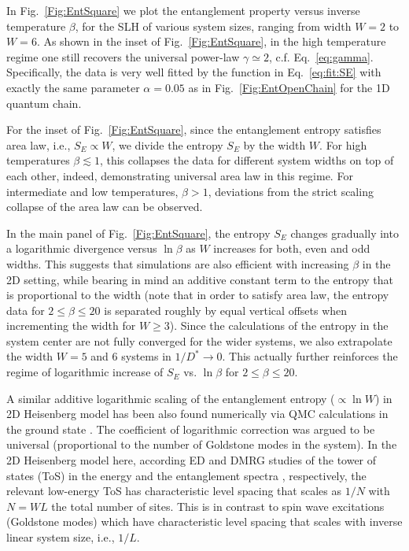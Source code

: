 \documentclass[aps,prx,twocolumn,showpacs,psfig,superscriptaddress,longbibliography]{revtex4-1}
\newcommand{\Eq}[1]{Eq.~\eqref{#1}}
\newcommand{\Fig}[1]{Fig.~\ref{#1}}
\def\Dstar{D^\ast}
\begin{document}
In \Fig{Fig:EntSquare} we plot the entanglement property versus
inverse temperature $\beta$, for the SLH of various system sizes, ranging from width $W=2$ to
$W=6$.
%
As shown in the inset of \Fig{Fig:EntSquare}, in the high
temperature regime one still recovers the universal power-law
$\gamma\simeq 2$, c.f. \Eq{eq:gamma}.  Specifically, the data is
very well fitted by the function in \Eq{eq:fit:SE} with exactly the
same parameter $\alpha=0.05$ as in \Fig{Fig:EntOpenChain} for the 1D
quantum chain.

For the inset of \Fig{Fig:EntSquare}, since the entanglement entropy
satisfies area law, i.e., $S_E \propto W$, we divide the entropy
$S_E$ by the width $W$.  For high temperatures $\beta \lesssim 1$,
this collapses the data for different system widths on top of each
other, indeed, demonstrating universal area law in this regime.  For
intermediate and low temperatures, $\beta > 1$, deviations from the
strict scaling collapse of the area law can be observed.

In the main panel of \Fig{Fig:EntSquare}, the entropy $S_E$ changes
gradually into a logarithmic divergence versus $\ln{\beta}$ as $W$
increases for both, even and odd widths.  This suggests that
simulations are also efficient with increasing $\beta$ in the 2D
setting, while bearing in mind an additive constant term to the
entropy that is proportional to the width (note that in order to
satisfy area law, the entropy data for $2 \leq \beta \leq 20$ is
separated roughly by equal vertical offsets when incrementing the
width for $W\ge 3$).  Since the calculations of the entropy in the
system center are not fully converged for the wider systems, we also
extrapolate the width $W=5$ and $6$ systems in $1/\Dstar\to0$. This
actually further reinforces the regime of logarithmic increase of
$S_E$ vs. $\ln\beta$ for $2 \leq \beta \leq 20$.

A similar additive logarithmic scaling of the entanglement entropy
($\propto \ln{W}$) in 2D Heisenberg model has been also found
numerically via QMC calculations in the ground state
\cite{Kallin.a.b+:2011:Entanglement, Song.h.f+:2011:Entanglement,
Humeniuk.s+:2012:Entanglement, Kulchytskyy.b+:2015:Goldstone,
Luitz.d.j+:2015:Entanglement, Laflorencie.n+:2015:Entanglement}.
The coefficient of logarithmic correction was argued to be universal
\cite{Metlitski.m.a+:2011:Entanglement} (proportional to the number
of Goldstone modes in the system). In the 2D Heisenberg model here,
according ED and DMRG studies of the tower of states (ToS) in the
energy and the entanglement spectra \cite{Alba.v+:2013:Entanglement,
Kolley.f+:2013:Entanglement}, respectively, the relevant low-energy
ToS has characteristic level spacing that scales as $1/N$ with $N=W
L$ the total number of sites.  This is in contrast to spin wave
excitations (Goldstone modes) which have characteristic level
spacing that scales with inverse linear system size, i.e., $1/L$.
\end{document}
